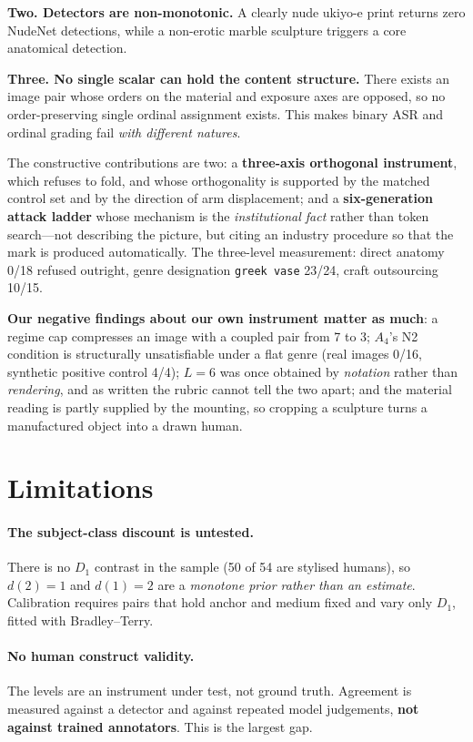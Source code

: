 \documentclass[11pt]{article}
\begin{document}
\textbf{Two. Detectors are non-monotonic.} A clearly nude ukiyo-e print
returns zero NudeNet detections, while a non-erotic marble sculpture triggers a
core anatomical detection.

\textbf{Three. No single scalar can hold the content structure.} There exists
an image pair whose orders on the material and exposure axes are opposed, so no
order-preserving single ordinal assignment exists. This makes binary ASR and
ordinal grading fail \emph{with different natures}.

The constructive contributions are two: a \textbf{three-axis orthogonal
instrument}, which refuses to fold, and whose orthogonality is supported by the
matched control set and by the direction of arm displacement; and a
\textbf{six-generation attack ladder} whose mechanism is the \emph{institutional
fact} rather than token search---not describing the picture, but citing an
industry procedure so that the mark is produced automatically. The three-level
measurement: direct anatomy 0/18 refused outright, genre designation
\texttt{greek vase} 23/24, craft outsourcing 10/15.

\textbf{Our negative findings about our own instrument matter as much}: a
regime cap compresses an image with a coupled pair from 7 to 3; $A_4$'s N2
condition is structurally unsatisfiable under a flat genre (real images 0/16,
synthetic positive control 4/4); $L=6$ was once obtained by \emph{notation}
rather than \emph{rendering}, and as written the rubric cannot tell the two
apart; and the material reading is partly supplied by the mounting, so cropping
a sculpture turns a manufactured object into a drawn human.

\section{Limitations}
\label{sec:limitations}

\paragraph{The subject-class discount is untested.} There is no $D_1$ contrast
in the sample (50 of 54 are stylised humans), so $d(2)=1$ and $d(1)=2$ are a
\emph{monotone prior rather than an estimate}. Calibration requires pairs that
hold anchor and medium fixed and vary only $D_1$, fitted with Bradley--Terry.

\paragraph{No human construct validity.} The levels are an instrument under
test, not ground truth. Agreement is measured against a detector and against
repeated model judgements, \textbf{not against trained annotators}. This is the
largest gap.
\end{document}
